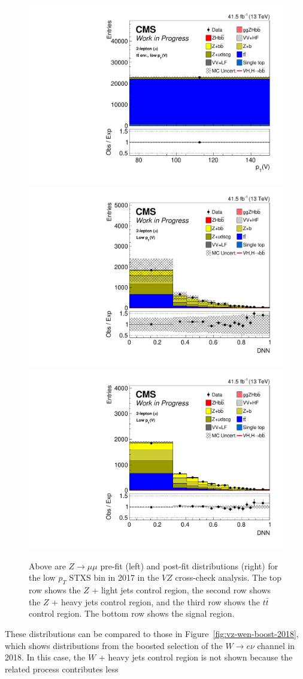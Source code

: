 \begin{figure}
  \includegraphics[width=0.35\linewidth]{figures/210323_STXS_VZ_unblinded_XbbVZ_8fe9e9cd_postfitplots/plot_shapes_vhbb_Zmm_4_13TeV2017_postfit} \\
  \includegraphics[width=0.35\linewidth]{figures/210323_STXS_VZ_unblinded_XbbVZ_8fe9e9cd_postfitplots/plot_shapes_vhbb_Zmm_1_13TeV2017_prefit}
  \includegraphics[width=0.35\linewidth]{figures/210323_STXS_VZ_unblinded_XbbVZ_8fe9e9cd_postfitplots/plot_shapes_vhbb_Zmm_1_13TeV2017_postfit} \\
  \caption[$Z\rightarrow \mu\mu$ $V\!Z$ distributions for low $p_T$ in 2017]{
    Above are $Z\rightarrow \mu\mu$ pre-fit (left) and post-fit distributions (right)
    for the low $p_T$ STXS bin in 2017 in the $V\!Z$ cross-check analysis.
    The top row shows the $Z$ + light jets control region,
    the second row shows the $Z$ + heavy jets control region,
    and the third row shows the $t\bar{t}$ control region.
    The bottom row shows the signal region. 
  }
  \label{fig:vz-zmm-low-2017}
\end{figure}
%
These distributions can be compared to those in Figure~\ref{fig:vz-wen-boost-2018},
which shows distributions from the boosted selection of the $W\rightarrow e\nu$ channel in 2018.
In this case, the $W$ + heavy jets control region is not shown because the related process contributes less
